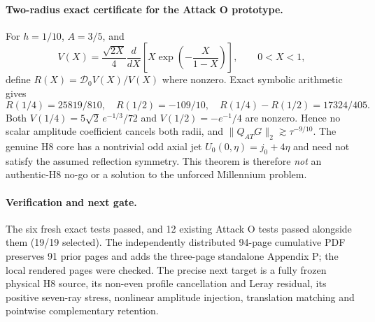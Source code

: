 \paragraph{Two-radius exact certificate for the Attack O prototype.}
For $h=1/10$, $A=3/5$, and
\[
V(X)=\frac{\sqrt{2X}}4\frac{d}{dX}
\left[X\exp\left(-\frac{X}{1-X}\right)\right],
\qquad 0<X<1,
\]
define $R(X)=\mathcal D_0V(X)/V(X)$ where nonzero. Exact symbolic arithmetic gives
\[
\boxed{R(1/4)=25819/810,\quad R(1/2)=-109/10,\quad
R(1/4)-R(1/2)=17324/405.}
\]
Both $V(1/4)=5\sqrt2\,e^{-1/3}/72$ and $V(1/2)=-e^{-1}/4$ are nonzero. Hence no scalar amplitude coefficient cancels both radii, and $\|Q_{AT}G\|_2\gtrsim\tau^{-9/10}$. The genuine H8 core has a nontrivial odd axial jet $U_0(0,\eta)=j_0+4\eta$ and need not satisfy the assumed reflection symmetry. This theorem is therefore \emph{not} an authentic-H8 no-go or a solution to the unforced Millennium problem.

\paragraph{Verification and next gate.}
The six fresh exact tests passed, and 12 existing Attack O tests passed alongside them (19/19 selected). The independently distributed 94-page cumulative PDF preserves 91 prior pages and adds the three-page standalone Appendix P; the local rendered pages were checked. The precise next target is a fully frozen physical H8 source, its non-even profile cancellation and Leray residual, its positive seven-ray stress, nonlinear amplitude injection, translation matching and pointwise complementary retention.